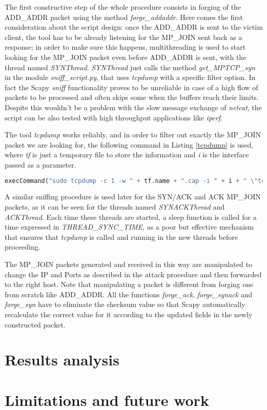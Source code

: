 The first constructive step of the whole procedure consists in forging of the ADD\_ADDR packet using the method \textit{forge\_addaddr}. Here comes the first consideration about the script design: once the ADD\_ADDR is sent to the victim client, the tool has to be already listening for the MP\_JOIN sent back as a response; in order to make sure this happens, multithreading is used to start looking for the MP\_JOIN packet even before ADD\_ADDR is sent, with the thread named \textit{SYNThread}. \textit{SYNThread} just calls the method \textit{get\_MPTCP\_syn} in the module \textit{sniff\_script.py}, that uses \textit{tcpdump} with a specific filter option. In fact the Scapy \textit{sniff} functionality proves to be unreliable in case of a high flow of packets to be processed and often skips some when the buffers reach their limits. Despite this wouldn't be a problem with the slow message exchange of \textit{netcat}, the script can be also tested with high throughput applications like \textit{iperf}.

The tool \textit{tcpdump} works reliably, and in order to filter out exactly the MP\_JOIN packet we are looking for, the following command in Listing \ref{tcpdump} is used, where \textit{tf} is just a temporary file to store the information and \textit{i} is the interface passed as a parameter.

\begin{lstlisting}[language=python, caption=\textit{tcpdump for MP\_JOIN}, label=tcpdump]
execCommand("sudo tcpdump -c 1 -w " + tf.name + ".cap -i " + i + " \"tcp[tcpflags] & tcp-syn != 0\" 2>/dev/null", shell = True)
\end{lstlisting}

A similar sniffing procedure is used later for the SYN/ACK and ACK MP\_JOIN packets, as it can be seen for the threads named \textit{SYNACKThread} and \textit{ACKThread}. Each time these threads are started, a sleep function is called for a time expressed in \textit{THREAD\_SYNC\_TIME}, as a poor but effective mechanism that ensures that \textit{tcpdump} is called and running in the new threads before proceeding.

The MP\_JOIN packets generated and received in this way are manipulated to change the IP and Ports as described in the attack procedure and then forwarded to the right host. Note that manipulating a packet is different from forging one from scratch like ADD\_ADDR. All the functions \textit{forge\_ack}, \textit{forge\_synack} and \textit{forge\_syn} have to eliminate the checksum value so that Scapy automatically recalculate the correct value for it according to the updated fields in the newly constructed packet.

\section{Results analysis}
\section{Limitations and future work} \label{limitationsandfuturework}

